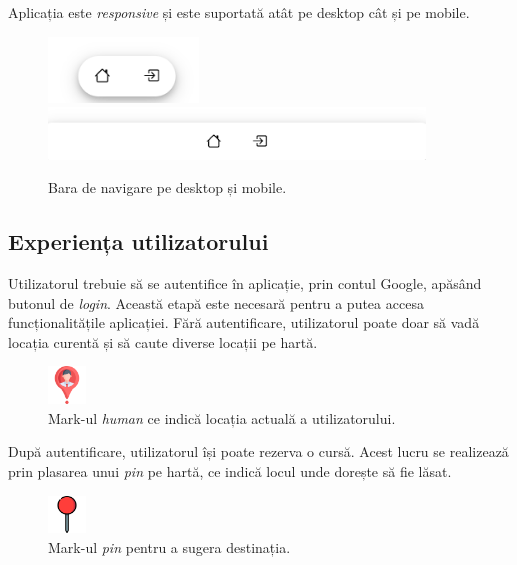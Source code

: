 Aplicația este \textit{responsive} și este suportată atât pe desktop cât și pe mobile.

\begin{figure}[H]
    \centering
    \includegraphics[width=4cm]{Assets/responsive1.png}
    \includegraphics[width=10cm]{Assets/responsive2.png}
    \caption{Bara de navigare pe desktop și mobile.}
    \label{fig:responsive}
\end{figure}

\subsection{Experiența utilizatorului}

Utilizatorul trebuie să se autentifice în aplicație, prin contul Google, apăsând butonul de \textit{login}. 
Această etapă este necesară pentru a putea accesa funcționalitățile aplicației.
Fără autentificare, utilizatorul poate doar să vadă locația curentă și să
caute diverse locații pe hartă.

\begin{figure}[H]
    \centering
    \includegraphics[width=1cm]{Assets/human.png}
    \caption{Mark-ul \textit{human} ce indică locația actuală a utilizatorului.}
    \label{fig:humanMark}
\end{figure}

După autentificare, utilizatorul își poate rezerva o cursă. Acest lucru se realizează prin
plasarea unui \textit{pin} pe hartă, ce indică locul unde dorește să fie lăsat.

\begin{figure}[H]
    \centering
    \includegraphics[width=1cm]{Assets/pin.png}
    \caption{Mark-ul \textit{pin} pentru a sugera destinația.}
    \label{fig:pinMark}
\end{figure}

